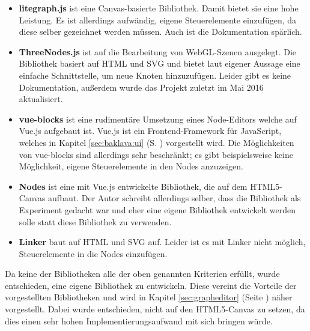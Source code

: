 \begin{itemize}
    \item \textbf{litegraph.js} ist eine Canvas-basierte Bibliothek. Damit bietet sie eine hohe Leistung. Es ist allerdings aufwändig, eigene Steuerelemente einzufügen, da diese selber gezeichnet werden müssen. Auch ist die Dokumentation spärlich. \cite{litegraph}
    \item \textbf{ThreeNodes.js} ist auf die Bearbeitung von WebGL-Szenen ausgelegt. Die Bibliothek basiert auf HTML und SVG und bietet laut eigener Aussage eine einfache Schnittstelle, um neue Knoten hinzuzufügen. Leider gibt es keine Dokumentation, außerdem wurde das Projekt zuletzt im Mai 2016 aktualisiert. \cite{threenodes}
    \item \textbf{vue-blocks} ist eine rudimentäre Umsetzung eines Node-Editors welche auf Vue.js aufgebaut ist. Vue.js ist ein Frontend-Framework für JavaScript, welches in Kapitel \ref{sec:baklava:ui} (S. \pageref{sec:baklava:ui}) vorgestellt wird. Die Möglichkeiten von vue-blocks sind allerdings sehr beschränkt; es gibt beispielsweise keine Möglichkeit, eigene Steuerelemente in den Nodes anzuzeigen. \cite{vueblocks}
    \item \textbf{Nodes} ist eine mit Vue.js entwickelte Bibliothek, die auf dem HTML5-Canvas aufbaut. Der Autor schreibt allerdings selber, dass die Bibliothek als Experiment gedacht war und eher eine eigene Bibliothek entwickelt werden solle statt diese Bibliothek zu verwenden. \cite{nodes}
    \item \textbf{Linker} baut auf HTML und SVG auf. Leider ist es mit Linker nicht möglich, Steuerelemente in die Nodes einzufügen. \cite{linker}
\end{itemize}

Da keine der Bibliotheken alle der oben genannten Kriterien erfüllt, wurde entschieden, eine eigene Bibliothek zu entwickeln. Diese vereint die Vorteile der vorgestellten Bibliotheken und wird in Kapitel \ref{sec:grapheditor} (Seite \pageref{sec:grapheditor}) näher vorgestellt. Dabei wurde entschieden, nicht auf den HTML5-Canvas zu setzen, da dies einen sehr hohen Implementierungsaufwand mit sich bringen würde.